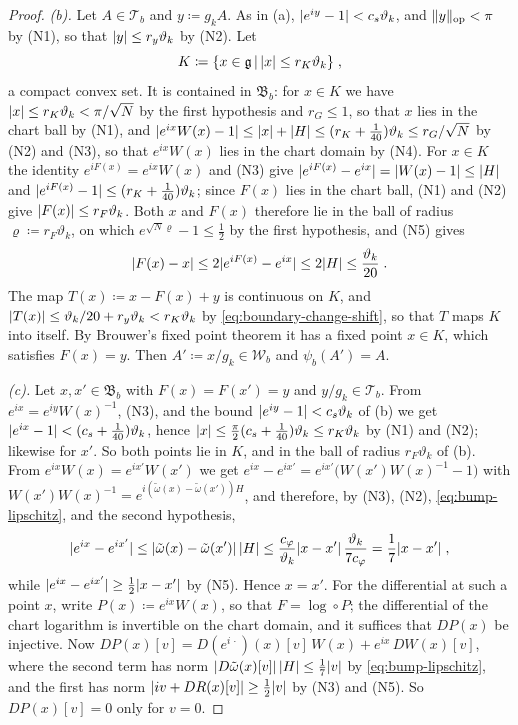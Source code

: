 \documentclass[11pt]{preprint}
\DeclarePairedDelimiter{\abs}{\lvert}{\rvert}
\DeclarePairedDelimiter{\norm}{\lVert}{\rVert}
\numberwithin{equation}{section}
\theoremstyle{definition}
\theoremstyle{remark}
\theoremstyle{plain}
\begin{document}
\begin{proof}
\emph{(b).} Let $A \in \mathcal T_b$ and $y \coloneqq g_kA$. As in (a), $\abs{e^{iy} - 1} < c_s\vartheta_k$, and $\norm{y}_{\mathrm{op}} < \pi$ by (N1), so that $\abs y \leq r_y\vartheta_k$ by (N2). Let
\[
    K \coloneqq \{ x \in \mathfrak g \,|\, \abs x \leq r_K\vartheta_k \}\;,
\]
a compact convex set. It is contained in $\mathfrak B_b$: for $x \in K$ we have $\abs x \leq r_K\vartheta_k < \pi/\sqrt N$ by the first hypothesis and $r_G \leq 1$, so that $x$ lies in the chart ball by (N1), and $\abs{e^{ix}W(x) - 1} \leq \abs x + \abs H \leq (r_K + \frac{1}{40})\vartheta_k \leq r_G/\sqrt N$ by (N2) and (N3), so that $e^{ix}W(x)$ lies in the chart domain by (N4). For $x \in K$ the identity $e^{iF(x)} = e^{ix}W(x)$ and (N3) give $\abs{e^{iF(x)} - e^{ix}} = \abs{W(x) - 1} \leq \abs H$ and $\abs{e^{iF(x)} - 1} \leq (r_K + \frac{1}{40})\vartheta_k$; since $F(x)$ lies in the chart ball, (N1) and (N2) give $\abs{F(x)} \leq r_F\vartheta_k$. Both $x$ and $F(x)$ therefore lie in the ball of radius $\varrho \coloneqq r_F\vartheta_k$, on which $e^{\sqrt N\varrho} - 1 \leq \frac12$ by the first hypothesis, and (N5) gives
\begin{equation}\label{eq:boundary-change-shift}
    \abs{F(x) - x} \leq 2\abs{e^{iF(x)} - e^{ix}} \leq 2\abs H \leq \frac{\vartheta_k}{20}\;.
\end{equation}
The map $T(x) \coloneqq x - F(x) + y$ is continuous on $K$, and $\abs{T(x)} \leq \vartheta_k/20 + r_y\vartheta_k < r_K\vartheta_k$ by \eqref{eq:boundary-change-shift}, so that $T$ maps $K$ into itself. By Brouwer's fixed point theorem it has a fixed point $x \in K$, which satisfies $F(x) = y$. Then $A' \coloneqq x/g_k \in \mathcal W_b$ and $\psi_b(A') = A$.

\emph{(c).} Let $x, x' \in \mathfrak B_b$ with $F(x) = F(x') = y$ and $y/g_k \in \mathcal T_b$. From $e^{ix} = e^{iy}W(x)^{-1}$, (N3), and the bound $\abs{e^{iy} - 1} < c_s\vartheta_k$ of (b) we get $\abs{e^{ix} - 1} < (c_s + \frac{1}{40})\vartheta_k$, hence $\abs x \leq \frac{\pi}{2}(c_s + \frac{1}{40})\vartheta_k \leq r_K\vartheta_k$ by (N1) and (N2); likewise for $x'$. So both points lie in $K$, and in the ball of radius $r_F\vartheta_k$ of (b). From $e^{ix}W(x) = e^{ix'}W(x')$ we get $e^{ix} - e^{ix'} = e^{ix'}\bigl(W(x')W(x)^{-1} - 1\bigr)$ with $W(x')W(x)^{-1} = e^{i(\tilde\omega(x) - \tilde\omega(x'))H}$, and therefore, by (N3), (N2), \eqref{eq:bump-lipschitz}, and the second hypothesis,
\[
    \abs{e^{ix} - e^{ix'}} \leq \abs{\tilde\omega(x) - \tilde\omega(x')}\,\abs H \leq \frac{c_\varphi}{\vartheta_k}\abs{x - x'}\,\frac{\vartheta_k}{7c_\varphi} = \frac17\abs{x - x'}\;,
\]
while $\abs{e^{ix} - e^{ix'}} \geq \frac12\abs{x - x'}$ by (N5). Hence $x = x'$. For the differential at such a point $x$, write $P(x) \coloneqq e^{ix}W(x)$, so that $F = \log \circ P$; the differential of the chart logarithm is invertible on the chart domain, and it suffices that $DP(x)$ be injective. Now $DP(x)[v] = D(e^{i\,\cdot})(x)[v]\,W(x) + e^{ix}\,DW(x)[v]$, where the second term has norm $\abs{D\tilde\omega(x)[v]}\,\abs H \leq \frac17\abs v$ by \eqref{eq:bump-lipschitz}, and the first has norm $\abs{iv + DR(x)[v]} \geq \frac12\abs v$ by (N3) and (N5). So $DP(x)[v] = 0$ only for $v = 0$.


\end{proof}
\end{document}
